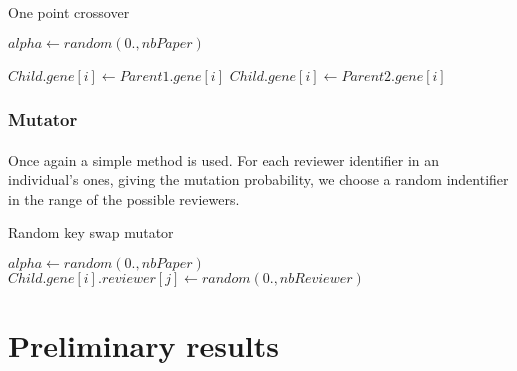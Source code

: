 \documentclass{article}
\begin{document}
      \begin{algorithm}
      \caption{One point crossover}\label{pseudo1}
      \begin{algorithmic}[1]
      \State $alpha\gets random(0.,nbPaper)$ 
        
          \State $Child.gene[i]\gets Parent1.gene[i]$
        \Else
          \State $Child.gene[i]\gets Parent2.gene[i]$
        \EndIf

      \EndFor
      \EndProcedure
      \end{algorithmic}
      \end{algorithm}

    
    
    \subsubsection{Mutator} %
    \label{ssub:Mutator}
    
      \paragraph{} %
      \label{par:}
      Once again a simple method is used. For each reviewer identifier in an
      individual's ones, giving the mutation probability, we choose a random
      indentifier in the range of the possible reviewers.

      \begin{algorithm}
      \caption{Random key swap mutator}\label{pseudo2}
      \begin{algorithmic}[2]
      \State $alpha\gets random(0.,nbPaper)$ 
            \State $Child.gene[i].reviewer[j]\gets random(0., nbReviewer)$
          \EndFor
        \EndFor
      \EndProcedure
      \end{algorithmic}
      \end{algorithm}


  \section{Preliminary results} %
  \label{sec:Preliminaty Result}
    
\end{document}
